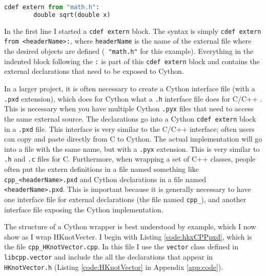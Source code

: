     \vspace{.2in}
    \begin{lstlisting}[language=python]
    cdef extern from "math.h":
        double sqrt(double x)
    \end{lstlisting}
    \mainstretch{}

    \noindent In the first line I started a \texttt{cdef extern} block. The syntax is simply \texttt{cdef extern from <headerName>:}, where \texttt{headerName} is the name of the external file where the desired objects are defined (\texttt{ "math.h"} for this example). Everything in the indented block following the \texttt{:} is part of this \texttt{cdef extern} block and contains the external declarations that need to be exposed to Cython.

    In a larger project, it is often necessary to create a Cython interface file (with a \texttt{.pxd} extension), which does for Cython what a \texttt{.h} interface file does for C/C++ . This is necessary when you have multiple Cython \texttt{.pyx} files that need to access the same external source. The declarations go into a  Cython \texttt{cdef extern} block in a \texttt{.pxd} file. This interface is very similar to the C/C++ interface; often users can copy and paste directly from C to Cython. The actual implementation will go into a file with the same name, but with a \texttt{.pyx} extension. This is very similar to \texttt{.h} and \texttt{.c}  files for C. Furthermore, when wrapping a set of C++ classes, people often put the extern definitions in a file named something like \texttt{cpp\_<headerName>.pxd} and Cython declarations in a file named \texttt{<headerName>.pxd}. This is important because it is generally necessary to have one interface file for external declarations (the file named \texttt{cpp\_}), and another interface file exposing the Cython implementation.

    The structure of a Cython wrapper is best understood by example, which I now show as I wrap HKnotVecter.
    I begin with Listing \ref{code:hkxCPPpxd}, which is the file \texttt{cpp\_HKnotVector.cpp}. In this file I use the \texttt{vector} class defined in \texttt{libcpp.vector} and include the all the declarations that appear in \texttt{HKnotVector.h} (Listing \ref{code:HKnotVector} in Appendix \ref{app:code}).

